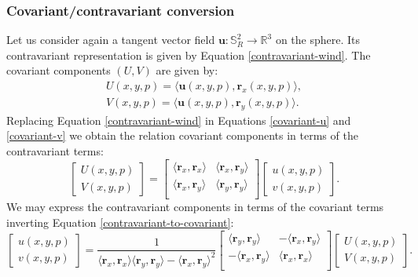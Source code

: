 \subsubsection{Covariant/contravariant conversion}
\label{anexo-cov-con}
Let us consider again a tangent vector field $\boldsymbol{u}: \mathbb{S}^2_R \to 
\mathbb{R}^3$ on the sphere. Its contravariant representation 
is given by Equation \eqref{contravariant-wind}.
The covariant components $(U,V)$ are given by:
\begin{align}
	\label{covariant-u}
	U(x,y,p) = \langle \boldsymbol{u}(x,y,p) , \boldsymbol{r}_x(x,y,p)  \rangle, \\
	\label{covariant-v}
	V(x,y,p) = \langle \boldsymbol{u}(x,y,p) , \boldsymbol{r}_y(x,y,p)  \rangle.
\end{align}
Replacing Equation \eqref{contravariant-wind} in 
Equations \eqref{covariant-u} and \eqref{covariant-v} we obtain
the relation covariant components in terms of the
contravariant terms:
\begin{equation}
	\label{contravariant-to-covariant}
	\begin{bmatrix}
		{U}(x,y,p) \\
		{V}(x,y,p)
	\end{bmatrix}
	=
	\begin{bmatrix}
		  \langle \boldsymbol{r}_x, \boldsymbol{r}_x \rangle
		& \langle \boldsymbol{r}_x, \boldsymbol{r}_y \rangle \\
		  \langle \boldsymbol{r}_x, \boldsymbol{r}_y \rangle 
		& \langle \boldsymbol{r}_y, \boldsymbol{r}_y \rangle \\
	\end{bmatrix}
	\begin{bmatrix}
		{u} (x,y,p) \\
		{v} (x,y,p) 
	\end{bmatrix}.
\end{equation}
We may express the contravariant components in terms of 
the covariant terms inverting Equation \eqref{contravariant-to-covariant}:
\begin{equation}
	\label{convariant-to-contravariant}
	\begin{bmatrix}
		{u}(x,y,p) \\
		{v}(x,y,p)
	\end{bmatrix}
	= \frac{1}{\langle \boldsymbol{r}_x, \boldsymbol{r}_x \rangle
               \langle \boldsymbol{r}_y, \boldsymbol{r}_y \rangle
             - \langle \boldsymbol{r}_x, \boldsymbol{r}_y \rangle^2}
	\begin{bmatrix}
		  \langle \boldsymbol{r}_y, \boldsymbol{r}_y \rangle
		& -\langle \boldsymbol{r}_x, \boldsymbol{r}_y \rangle \\
		  -\langle \boldsymbol{r}_x, \boldsymbol{r}_y \rangle 
		& \langle \boldsymbol{r}_x, \boldsymbol{r}_x \rangle \\
	\end{bmatrix}
	\begin{bmatrix}
		{U} (x,y,p) \\
		{V} (x,y,p) 
	\end{bmatrix}.
\end{equation}
